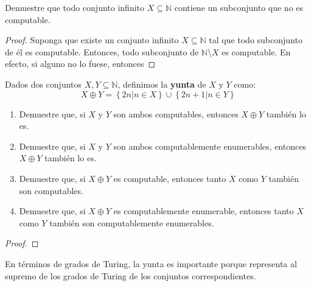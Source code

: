 \documentclass[12pt]{report}
\newcounter{it}
\theoremstyle{largebreak}
\begin{document}
    \begin{excer}
        Demuestre que todo conjunto infinito $X\subseteq\mathbb{N}$ contiene un subconjunto que no es computable.
    \end{excer}
    
    \begin{proof}
        Suponga que existe un conjunto infinito $X\subseteq\mathbb{N}$ tal que todo subconjunto de él es computable. Entonces, todo subconjunto de $\mathbb{N}\setminus X$ es computable. En efecto, si alguno no lo fuese, entonces 
    \end{proof}

    \begin{excer}
        Dados dos conjuntos $X,Y\subseteq\mathbb{N}$, definimos la \textbf{yunta} de $X$ y $Y$ como:
        \begin{equation*}
            X\oplus Y=\left\{2n\Big|n\in X \right\}\cup\left\{2n+1\Big|n\in Y \right\}
        \end{equation*}
        \begin{enumerate}[label = \textit{(\alph*)}]
            \item Demuestre que, si $X$ y $Y$ son ambos computables, entonces $X\oplus Y$ también lo es.
            \item Demuestre que, si $X$ y $Y$ son ambos computablemente enumerables, entonces $X\oplus Y$ también lo es.
            \item Demuestre que, si $X\oplus Y$ es computable, entonces tanto $X$ como $Y$ también son computables.
            \item Demuestre que, si $X\oplus Y$ es computablemente enumerable, entonces tanto $X$ como $Y$ también son computablemente enumerables.
        \end{enumerate}
    \end{excer}

    \begin{proof}
        
    \end{proof}

    \begin{obs}
        En términos de grados de Turing, la yunta es importante porque representa al supremo de los grados de Turing de los conjuntos correspondientes.
    \end{obs}
\end{document}
